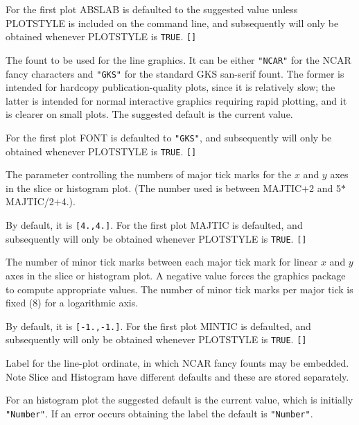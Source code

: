 \documentclass[twoside,11pt]{article}
\newcommand{\sstsubsection}[1]{ \item[{#1}] \mbox{} \\}
\renewcommand{\sstsubsection}[1]{\item[{#1}]}
\begin{document}
{{{         For the first plot ABSLAB is defaulted to the suggested value
         unless PLOTSTYLE is included on the command line, and
         subsequently will only be obtained whenever PLOTSTYLE is {\tt TRUE}.
         {\tt []}
      }
      \sstsubsection{
         FONT = LITERAL (Read)
      }{
         The fount to be used for the line graphics.  It can be either
         {\tt "NCAR"} for the NCAR fancy characters and {\tt "GKS"} for the standard
         GKS san-serif fount.   The former is intended for hardcopy
         publication-quality plots, since it is relatively slow; the
         latter is intended for normal interactive graphics requiring
         rapid plotting, and it is clearer on small plots. The
         suggested default is the current value.

         For the first plot FONT is defaulted to {\tt "GKS"}, and subsequently
         will only be obtained whenever PLOTSTYLE is {\tt TRUE}. {\tt []}
      }
      \sstsubsection{
         MAJTIC( 2 ) = \_REAL (Read)
      }{
         The parameter controlling the numbers of major tick marks
         for the $x$ and $y$ axes in the slice or histogram plot.
         (The number used is between MAJTIC$+$2 and 5$*$MAJTIC/2$+$4.).

         By default, it is {\tt [4.,4.]}.  For the first plot MAJTIC is
         defaulted, and subsequently will only be obtained whenever
         PLOTSTYLE is {\tt TRUE}.  {\tt []}
      }
      \sstsubsection{
         MINTIC( 2 ) = \_REAL (Read)
      }{
         The number of minor tick marks between each major tick mark
         for linear $x$ and $y$ axes in the slice or histogram plot.  A
         negative value forces the graphics package to compute
         appropriate values.  The number of minor tick marks per major
         tick is fixed (8) for a logarithmic axis.

         By default, it is {\tt [-1.,-1.]}.  For the first plot MINTIC is
         defaulted, and subsequently will only be obtained whenever
         PLOTSTYLE is {\tt TRUE}.  {\tt []}
      }
      \sstsubsection{
         ORDLAB  =  LITERAL (Read)
      }{
         Label for the line-plot ordinate, in which NCAR fancy founts
         may be embedded.  Note Slice and Histogram have different
         defaults and these are stored separately.

         For an histogram plot the suggested default is the current
         value, which is initially {\tt "Number"}.  If an error occurs
         obtaining the label the default is {\tt "Number"}.

}}}
\end{document}
